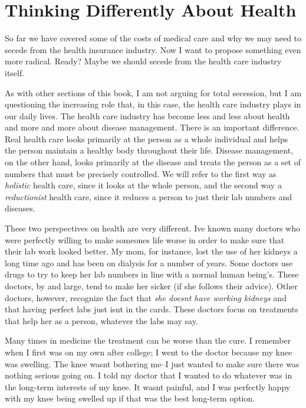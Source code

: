 \section{Thinking Differently About
Health}

So far we have covered some of the costs of medical care and why we may
need to secede from the health insurance industry. Now I want to
propose something
even more
radical. Ready? Maybe
we should secede from the health care industry itself.


As with other sections
of this book, I am not arguing for total
secession, but 
I am questioning the
increasing role that,
in this case, the health care industry plays in our daily lives. The
health care industry has become less and less about health and more and
more about disease management. There is an important difference. Real
health care looks primarily at the person as a whole individual and
helps the person maintain a healthy body throughout their life. Disease
management, on the other hand, looks primarily at the disease and
treats the person as a set of numbers that must be precisely
controlled. We will refer to the first way as \textit{holistic} health
care, since it looks at the whole person, and the second way a
\textit{reductionist} health care, since it reduces a person to just
their lab numbers and diseases.


These two perspectives on health are very different.
I{\textquotesingle}ve known many doctors who were perfectly willing to
make someone{\textquotesingle}s life worse in order to make sure that
their lab work looked better. My mom, for instance, lost the use of her
kidneys a long time ago and has been on dialysis for a number of years.
Some doctors use drugs to try to keep her lab numbers in line with a
normal human being’s. These doctors, by and large, tend to make her
sicker (if she follows their advice). Other doctors, however, recognize
the fact that \textit{she doesn{\textquotesingle}t have working
kidneys} and that having perfect labs just isn{\textquotesingle}t in
the cards.  These doctors focus on treatments that help her as a
person, whatever the labs may say.


Many times in medicine the treatment can be worse than the cure. I
remember when I first was on my own after college; I went to the doctor
because my knee was swelling. The knee wasn{\textquotesingle}t
bothering me–I just wanted to make sure there was nothing serious
going on. I told my
doctor that I wanted to do whatever was in the long-term interests of
my knee. It wasn{\textquotesingle}t painful, and I was perfectly happy
with my knee being swelled up if that was the best long-term option. 


